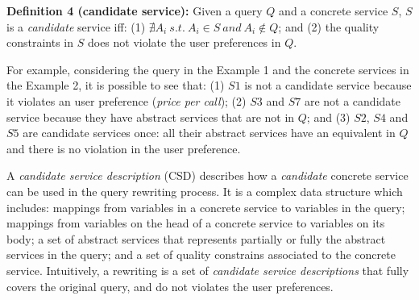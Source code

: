 \documentclass[12pt,a4paper,oneside]{article}
\begin{document}
\noindent \textbf{Definition 4 (candidate service):} Given a query $Q$ and a concrete service $S$, $S$ is a \textit{candidate} service iff: (1) $\nexists A_{i} \ s.t. \ A_{i} \in S \ and \ A_{i} \not\in Q$; and (2) the quality constraints in $S$ does not violate the user preferences in $Q$. 

For example, considering the query in the Example 1 and the concrete services in the Example 2, it is possible to see that:
(1) $S1$ is not a candidate service because it violates an user preference (\textit{price per call});
(2) $S3$ and $S7$ are not a candidate service because they have abstract services that are not in $Q$; and
(3) $S2$, $S4$ and $S5$ are candidate services once: all their abstract services have an equivalent in $Q$ and there is no violation in the user preference.



A \textit{candidate service description} (CSD) describes how a \textit{candidate} concrete service can be used in the query rewriting process.
It is a complex data structure which includes: mappings from variables in a concrete service to variables in the query; 
mappings from variables on the head of a concrete service to variables on its body;
a set of abstract services that represents partially or fully the abstract services in the query; and 
a set of quality constrains associated to the concrete service.
Intuitively, a rewriting is a set of \textit{candidate service descriptions} that fully covers the original query, and do not violates the user preferences.
\end{document}
